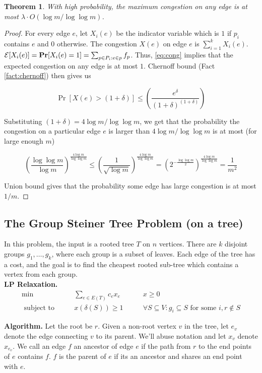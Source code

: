 \documentclass[11pt]{article}
\newtheorem{theorem}{Theorem}
\begin{document}
\begin{theorem}
With high probability, the maximum congestion on any edge is at most $\lambda\cdot O(\log m/\log\log m)$.
\end{theorem}
\begin{proof}
For every edge $e$, let $X_i(e)$ be the indicator variable which is $1$ if $p_i$ contains $e$ and $0$ otherwise. The congestion $X(e)$ on edge $e$ is $\sum_{i=1}^k X_i(e)$. 
$\mathcal E[X_i(e)] = {\mathbf{Pr}}[X_i(e) = 1] = \sum_{p\in P_i:e\in p} f_p$. Thus, \eqref{eq:cong} implies that the expected congestion on any edge is at most $1$. Chernoff bound (Fact \ref{fact:chernoff}) then gives us

$$\Pr[X(e) > (1 + \delta)] \le \left( \frac{e^\delta}{(1+\delta)^{(1+\delta)}}\right)$$

Substituting $(1+\delta) = 4\log m/\log\log m$, we get that the probability the congestion on a particular edge $e$ is larger than $4\log m/\log\log m$ is at most  (for large enough $m$)

$$\left(\frac{\log\log m}{\log m}\right)^{\frac{4\log m}{\log\log m}} \le \left(\frac{1}{\sqrt{\log m}}\right)^{\frac{4\log m}{\log\log m}} =  \left(2^{-\frac{\log \log m}{2}}\right)^{\frac{4\log m}{\log\log m}} = \frac{1}{m^2}$$
 
 Union bound gives that the probability some edge has large congestion is at most $1/m$.
 
\end{proof}
\fi
\subsection*{The Group Steiner Tree Problem (on a tree)}
In this problem, the input is a rooted tree $T$ on $n$ vertices. There are $k$ disjoint groups $g_1,\ldots,g_k$, 
where each group is a subset of leaves. Each edge of the tree has a cost, and the goal is to find the cheapest rooted sub-tree which contains a vertex from each group. \\

\noindent
{\bf LP Relaxation.}
\begin{align}
\min & \qquad \sum_{e\in E(T)} c_ex_e & \qquad x \ge 0 \label{lp:gst} \\
\textrm{ subject to} 	& \qquad x(\delta(S)) \ge 1 & \qquad \forall S\subseteq V: g_i\subseteq S \textrm{ for some } i, r\notin S
\end{align}

\noindent
{\bf Algorithm.} Let the root be $r$. Given a non-root vertex $v$ in the tree, let $e_v$ denote the edge connecting $v$ to its parent. We'll abuse notation and let $x_v$ denote $x_{e_v}$.
We call an edge $f$ an ancestor of edge $e$ if the path from $r$ 
to the end points of $e$ contains $f$. $f$ is the parent of $e$ if its an ancestor and shares an end point with $e$. \\
\end{document}
